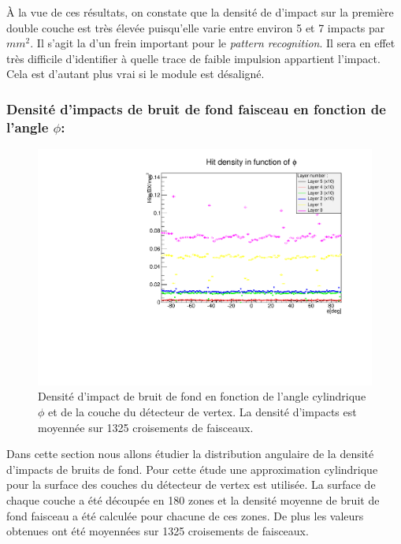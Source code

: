  \medskip
  
 \`A la vue de ces r\'esultats, on constate que la densit\'e de d'impact sur la premi\`ere double couche est tr\`es \'elev\'ee puisqu'elle varie entre environ 5 et 7 impacts par $mm^2$. Il s'agit la d'un frein important pour le \textit{pattern recognition}. Il sera en effet tr\`es difficile d'identifier à quelle trace de faible impulsion appartient l'impact. Cela est d'autant plus vrai si le module est d\'esalign\'e.

 \FloatBarrier
 
 \subsubsection{Densit\'e d'impacts de bruit de fond faisceau en fonction de l'angle $\phi$:}

  \begin{figure}[!htb]
    \begin{center}
    \includegraphics[scale=0.68]{./figures/Beamstrahlung/hitDensities_vs_phi_AllLayers.pdf}
    \caption{Densit\'e d'impact de bruit de fond en fonction de l'angle cylindrique $\phi$ et de la couche du d\'etecteur de vertex. La densit\'e d'impacts est moyenn\'ee sur 1325 croisements de faisceaux.}
    \label{fig:hitDensitiesVsPhi_AllLayers}
    \end{center}
  \end{figure}
 
 Dans cette section nous allons \'etudier la distribution angulaire de la densit\'e d'impacts de bruits de fond. Pour cette \'etude une approximation cylindrique pour la surface des couches du d\'etecteur de vertex est utilis\'ee. La surface de chaque couche a \'et\'e d\'ecoup\'ee en 180 zones et la densit\'e moyenne de bruit de fond faisceau a \'et\'e calcul\'ee pour chacune de ces zones. De plus les valeurs obtenues ont \'et\'e moyenn\'ees sur 1325 croisements de faisceaux.
 
